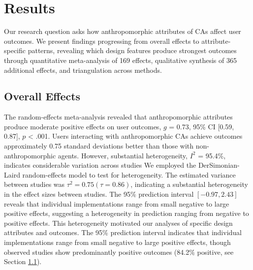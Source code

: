 \documentclass[manuscript,anonymous,sigconf]{acmart}
\begin{document}
\section{Results}

Our research question asks how anthropomorphic attributes of CAs affect user outcomes. We present findings progressing from overall effects to attribute-specific patterns, revealing which design features produce strongest outcomes through quantitative meta-analysis of 169 effects, qualitative synthesis of 365 additional effects, and triangulation across methods.

\subsection{Overall Effects}

The random-effects meta-analysis revealed that anthropomorphic attributes produce moderate positive effects on user outcomes, $g$ = 0.73, 95\% CI [0.59, 0.87], $p$ < .001. Users interacting with anthropomorphic CAs achieve outcomes approximately 0.75 standard deviations better than those with non-anthropomorphic agents. However, substantial heterogeneity, $I^2$ = 95.4\%, indicates considerable variation across studies 
We employed the DerSimonian-Laird random-effects model \citep{dersimonian1986meta} to test for heterogeneity. The estimated variance between studies was $\tau^2 = 0.75 (\tau = 0.86)$, indicating a substantial heterogeneity in the effect sizes between studies. The 95\% prediction interval $[-0.97, 2.43]$ reveals that individual implementations range from small negative to large positive effects, suggesting a heterogeneity in prediction ranging from negative to positive effects. This heterogeneity motivated our analyses of specific design attributes and outcomes. The 95\% prediction interval indicates that individual implementations range from small negative to large positive effects, though observed studies show predominantly positive outcomes (84.2\% positive, see Section \ref{}). 
\end{document}
